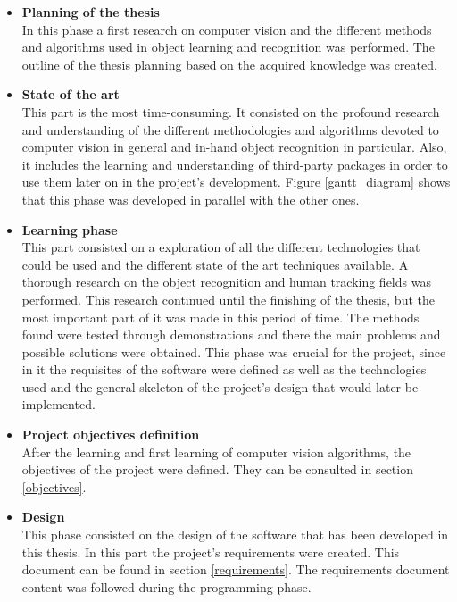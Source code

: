 		 \begin{itemize}
		 		\item{\textbf{Planning of the thesis}} \\
		 		In this phase a first research on computer vision and the different methods and algorithms used in object learning and recognition was performed. 
		 		The outline of the thesis planning based on the acquired knowledge was created. 

			 	\item{\textbf{State of the art}} \\
			 	This part is the most time-consuming.
			 	It consisted on the profound research and understanding of the different methodologies and algorithms devoted to computer vision in general and in-hand object recognition in particular. 
			 	Also, it includes the learning and understanding of third-party packages in order to use them later on in the project's development. 
			 	Figure \ref{gantt_diagram} shows that this phase was developed in parallel with the other ones. 
\newpage
			 	\item{\textbf{Learning phase}} \\
			 	This part consisted on a exploration of all the different technologies that could be used and the different state of the art techniques available. A thorough research on the object recognition and human tracking fields was performed. This research continued until the finishing of the thesis, but the most important part of it was made in this period of time. 
			 	The methods found were tested through demonstrations and there the main problems and possible solutions were obtained. This phase was crucial for the project, since in it the requisites of the software were defined as well as the technologies used and the general skeleton of the project's design that would later be implemented. 
			 	\\

			 	\item{\textbf{Project objectives definition}} \\
			 	After the learning and first learning of computer vision algorithms, the objectives of the project were defined. 
			 	They can be consulted in section \ref{objectives}. 

			 	\item{\textbf{Design}} \\
			 	This phase consisted on the design of the software that has been developed in this thesis. 
			 	In this part the project's requirements were created. 
			 	This document can be found in section \ref{requirements}. 
			 	The requirements document content was followed during the programming phase. 


\end{itemize}
